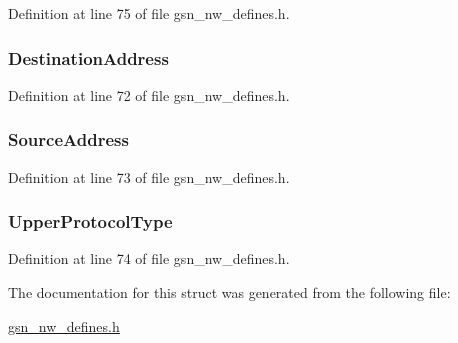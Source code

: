 Definition at line 75 of file gsn\_\-nw\_\-defines.h.

\hypertarget{a00068_a3b152d0996ae1d37bcef7cccaf86af80}{
\subsubsection[{DestinationAddress}]{ {\bf DestinationAddress}}}
\label{a00068_a3b152d0996ae1d37bcef7cccaf86af80}


Definition at line 72 of file gsn\_\-nw\_\-defines.h.

\hypertarget{a00068_a3c640ec8c496dd2a67910cef704b09ae}{
\subsubsection[{SourceAddress}]{ {\bf SourceAddress}}}
\label{a00068_a3c640ec8c496dd2a67910cef704b09ae}


Definition at line 73 of file gsn\_\-nw\_\-defines.h.

\hypertarget{a00068_aca61d6fc189d448598d7052324f08fcc}{
\subsubsection[{UpperProtocolType}]{ {\bf UpperProtocolType}}}
\label{a00068_aca61d6fc189d448598d7052324f08fcc}


Definition at line 74 of file gsn\_\-nw\_\-defines.h.



The documentation for this struct was generated from the following file:\begin{DoxyCompactItemize}
\item 
\hyperlink{a00533}{gsn\_\-nw\_\-defines.h}\end{DoxyCompactItemize}
